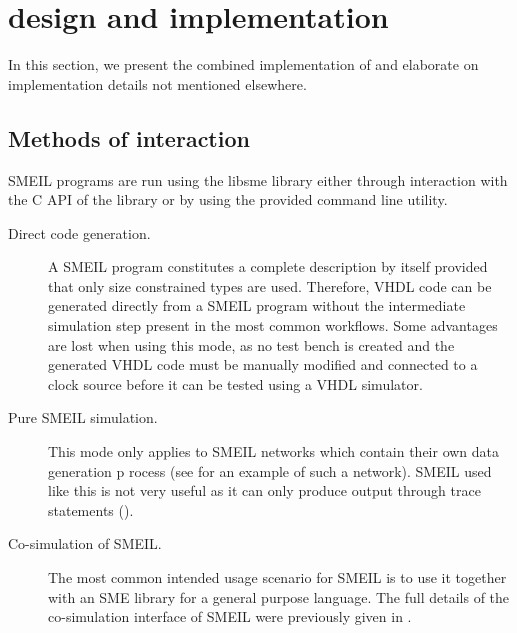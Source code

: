 \chapter{\libsme{} design and implementation}

In this section, we present the combined implementation of \libsme{} and
elaborate on implementation details not mentioned elsewhere.

\section{Methods of interaction}
\label{sec:using}
SMEIL programs are run using the {\ttfamily libsme} library either through interaction
with the C API of the library or by using the provided command line utility.

\begin{description}
\item[Direct code generation.] A SMEIL program constitutes a complete
  description by itself provided that only size constrained types are
  used. Therefore, VHDL code can be generated directly from a SMEIL program
  without the intermediate simulation step present in the most common
  workflows. Some advantages are lost when using this mode, as no test bench is
  created and the generated VHDL code must be manually modified and connected to
  a clock source before it can be tested using a VHDL simulator.
\item[Pure SMEIL simulation.] This mode only applies to SMEIL networks which
  contain their own data generation p rocess (see  for an example
  of such a network). SMEIL used like this is not very useful as it can only
  produce output through {\ttfamily trace} statements ().
\item[Co-simulation of SMEIL.] The most common intended usage scenario for SMEIL
  is to use it together with an SME library for a general purpose language. The
  full details of the co-simulation interface of SMEIL were previously given in
  .
\end{description}

